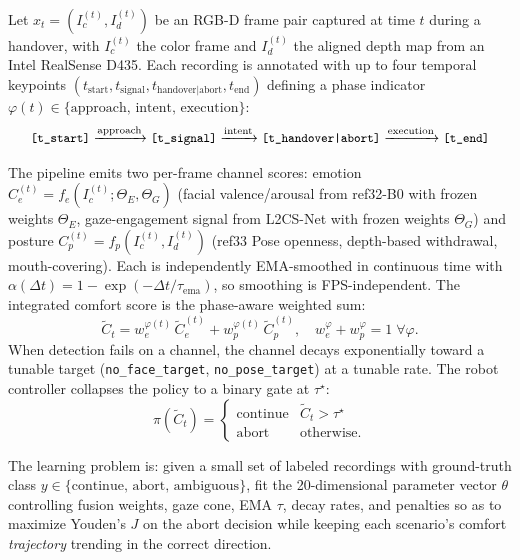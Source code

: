 \documentclass{article}
\newcommand{\code}[1]{\texttt{\small #1}}
\begin{document}
Let $x_t = (I_c^{(t)}, I_d^{(t)})$ be an RGB-D frame pair captured at time $t$ during a handover, with $I_c^{(t)}$ the color frame and $I_d^{(t)}$ the aligned depth map from an Intel RealSense D435. Each recording is annotated with up to four temporal keypoints $(t_\text{start}, t_\text{signal}, t_\text{handover|abort}, t_\text{end})$ defining a phase indicator $\varphi(t) \in \{\text{approach, intent, execution}\}$:
\[
\code{[t\_start]} \xrightarrow{\text{approach}} \code{[t\_signal]} \xrightarrow{\text{intent}} \code{[t\_handover|abort]} \xrightarrow{\text{execution}} \code{[t\_end]}
\]

The pipeline emits two per-frame channel scores: emotion $C_e^{(t)} = f_e(I_c^{(t)}; \Theta_E, \Theta_G)$ (facial valence/arousal from ref32-B0 with frozen weights $\Theta_E$, gaze-engagement signal from L2CS-Net with frozen weights $\Theta_G$) and posture $C_p^{(t)} = f_p(I_c^{(t)}, I_d^{(t)})$ (ref33 Pose openness, depth-based withdrawal, mouth-covering). Each is independently EMA-smoothed in continuous time with $\alpha(\Delta t) = 1 - \exp(-\Delta t / \tau_\text{ema})$, so smoothing is FPS-independent. The integrated comfort score is the phase-aware weighted sum:
\begin{equation}
\tilde{C}_t = w_e^{\varphi(t)}\,\tilde{C}_e^{(t)} + w_p^{\varphi(t)}\,\tilde{C}_p^{(t)},\quad w_e^\varphi + w_p^\varphi = 1\;\forall \varphi. \label{eq:fusion}
\end{equation}
When detection fails on a channel, the channel decays exponentially toward a tunable target (\code{no\_face\_target}, \code{no\_pose\_target}) at a tunable rate. The robot controller collapses the policy to a binary gate at $\tau^\star$:
\begin{equation}
\pi(\tilde{C}_t) = \begin{cases} \text{continue} & \tilde{C}_t > \tau^\star \\ \text{abort} & \text{otherwise}.\end{cases} \label{eq:policy}
\end{equation}

The learning problem is: given a small set of labeled recordings with ground-truth class $y \in \{\text{continue, abort, ambiguous}\}$, fit the 20-dimensional parameter vector $\theta$ controlling fusion weights, gaze cone, EMA $\tau$, decay rates, and penalties so as to maximize Youden's $J$ on the abort decision while keeping each scenario's comfort \emph{trajectory} trending in the correct direction.

\end{document}
